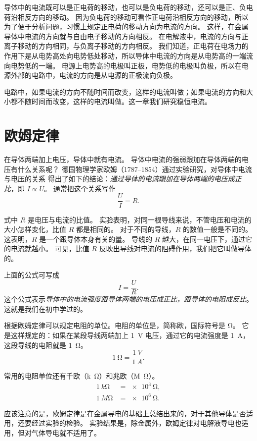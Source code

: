 导体中的电流既可以是正电荷的移动，也可以是负电荷的移动，还可以是正、负电荷沿相反方向的移动。
因为负电荷的移动可看作正电荷沿相反方向的移动，所以为了便于分析问题，习惯上规定正电荷的移动方向为电流的方向。
这样，在金属导体中电流的方向就与自由电子移动的方向相反。
在电解液中，电流的方向与正离子移动的方向相同，与负离子移动的方向相反。
我们知道，正电荷在电场力的作用下是从电势高处向电势低处移动，所以导体中电流的方向是从电势高的一端流向电势低的一端。
电源上电势高的电极叫正极，电势低的电极叫负极，所以在电源外部的电路中，电流的方向是从电源的正极流向负极。

电路中，如果电流的方向不随时间而改变，这样的电流叫做；如果电流的方向和大小都不随时间而改变，这样的电流叫做。这一章我们研究稳恒电流。

\section{欧姆定律}
在导体两端加上电压，导体中就有电流。
导体中电流的强弱跟加在导体两端的电压有什么关系呢？
德国物理学家欧姆（1787--1854）通过实验研究，对导体中电流与电压的关系
得出了如下的结论：\emph{通过导体的电流跟加在导体两端的电压成正比}，即 $I\propto U$。
通常把这个关系写作
\[\frac{U}{I}=R.\]

式中 $R$ 是电压与电流的比值。
实验表明，对同一根导线来说，不管电压和电流的大小怎样变化，比值 $R$ 都是相同的。
对于不同的导线，$R$ 的数值一般是不同的。
这表明，$R$ 是一个跟导体本身有关的量。
导线的 $R$ 越大，在同一电压下，通过它的电流就越小。
可见，比值 $R$ 反映出导线对电流的阻碍作用，我们把它叫做导体的。

上面的公式可写成
\[I=\frac{U}{R}.\]
这个公式表示\emph{导体中的电流强度跟导体两端的电压成正比，跟导体的电阻成反比}。
这就是我们在初中学过的。

根据欧姆定律可以规定电阻的单位。电阻的单位是，简称欧，国际符号是 \unit{\ohm}。
它是这样规定的：如果在某段导线两端加上 \qty{1}{V} 电压，通过它的电流强度是 \qty{1}{A}，这段导线的电阻就是 \qty{1}{\ohm}。
\[ \qty{1}{\ohm}=\frac{\qty{1}{V}}{\qty{1}{A}}.\]

常用的电阻单位还有千欧（\unit{k\ohm}）和兆欧（\unit{M\ohm}）。
\[\begin{split}
    \qty{1}{k\ohm}&= \qty{e3}{\ohm},\\
    \qty{1}{M\ohm}&= \qty{e6}{\ohm}.
\end{split}\]

应该注意的是，欧姆定律是在金属导电的基础上总结出来的，对于其他导体是否适用，还要经过实验的检验。
实验结果是，除金属外，欧姆定律对电解液导电也适用，但对气体导电就不适用了。

